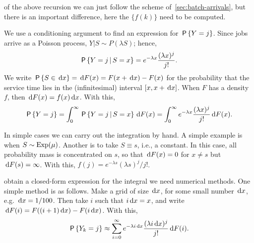  of the above recursion we can just follow the scheme of~\cref{sec:batch-arrivals}, but there is an important difference, here the $\{f(k)\}$ need to be computed.

We use a conditioning argument to find an expression for $\P{Y=j}$.
Since jobs arrive as a Poisson process, $Y|S \sim P(\lambda S)$; hence,
 \begin{equation*}
 \P{Y =j\given S=x} = e^{-\lambda x}\frac{(\lambda x)^j}{j!}.
 \end{equation*}
 We write $\P{S\in \d x} = \d F(x) = F(x + \d x) - F(x)$ for the probability that the service time lies in the (infinitesimal) interval $[x, x+\d x]$.
When $F$ has a density $f$, then $\d F(x) = f(x) \d x$.
With this,
 \begin{equation*}
 \P{Y=j} = \int_0^\infty \P{Y =j\given S=x} \d F(x)
= \int_0^\infty e^{-\lambda x}\frac{(\lambda x)^j}{j!} \d F(x).
\end{equation*}

In simple cases we can carry out the integration by hand.
A simple example is when $S\sim \Exp{\mu}$. Another is to take $S\equiv s$, i.e., a constant.
In this case, all probability mass is concentrated on $s$, so that $\d F( x) = 0$ for $x\neq s$ but $\d F(s) = \infty$.
With this, $f(j) = e^{-\lambda s}(\lambda s)^j/{j!}$.

 obtain a closed-form expression for the integral we need numerical methods.
One simple method is as follows.
Make a grid of size $\d x$, for some small number $\d x$, e.g.
$\d x=1/100$. Then  take $i$ such that $i \d x = x$, and  write $\d F(i ) =  F((i+1)\d x) - F(i \d x)$.
With this,
 \begin{equation*}
 \P{Y_k = j}  \approx \sum_{i=0}^\infty e^{-\lambda i \d x}\frac{(\lambda i\d x)^j}{j!} \d F(i).
\end{equation*}

